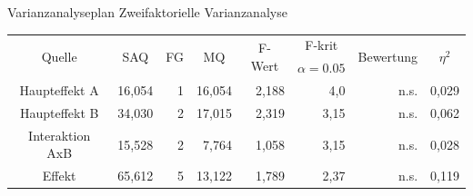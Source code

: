 \documentclass{beamer}
\begin{document}
	\begin{frame}{Varianzanalyseplan}
		Zweifaktorielle Varianzanalyse\\
		\begin{table}[]
			\centering
			\resizebox{\textwidth}{!} {
			\begin{tabular}{|c|r|r|r|r|r|r|r|}
				\hline
				\multirow{2}{*}{Quelle} & \multicolumn{1}{c|}{\multirow{2}{*}{SAQ}} & \multicolumn{1}{c|}{\multirow{2}{*}{FG}} & \multicolumn{1}{c|}{\multirow{2}{*}{MQ}} & \multicolumn{1}{c|}{\multirow{2}{*}{F-Wert}} & \multicolumn{1}{c|}{F-krit}        & \multicolumn{1}{c|}{\multirow{2}{*}{Bewertung}} & \multicolumn{1}{c|}{\multirow{2}{*}{$\eta^2$}} \\
				& \multicolumn{1}{c|}{}                     & \multicolumn{1}{c|}{}                    & \multicolumn{1}{c|}{}                    & \multicolumn{1}{c|}{}                        & \multicolumn{1}{c|}{$\alpha=0.05$} & \multicolumn{1}{c|}{}                           & \multicolumn{1}{c|}{}                          \\ \hline
				Haupteffekt A           & 16,054                                    & 1                                        & 16,054                                   & 2,188                                        & 4,0                                & n.s.                                            & 0,029                                          \\ \hline
				Haupteffekt B           & 34,030                                    & 2                                        & 17,015                                   & 2,319                                        & 3,15                               & n.s.                                            & 0,062                                          \\ \hline
				Interaktion AxB         & 15,528                                    & 2                                        & 7,764                                    & 1,058                                        & 3,15                               & n.s.                                            & 0,028                                          \\ \hline
				Effekt                  & 65,612                                    & 5                                        & 13,122                                   & 1,789                                        & 2,37                               & n.s.                                            & 0,119                                          \\ \hline

\end{tabular}}
\end{table}
\end{frame}
\end{document}
